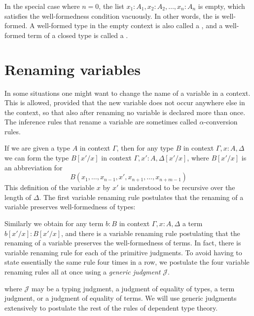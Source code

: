 In the special case where $n=0$, the list $x_1:A_1,x_2:A_2,\ldots,x_n:A_n$ is empty, which satisfies the well-formedness condition vacuously. In other words, the  is well-formed. A well-formed type in the empty context is also called a , and a well-formed term of a closed type is called a .

\section{Renaming variables}
In some situations one might want to change the name of a variable in a context. This is allowed, provided that the new variable does not occur anywhere else in the context, so that also after renaming no variable is declared more than once. 
The inference rules that rename a variable are sometimes called $\alpha$-conversion rules. 

If we are given a type $A$ in context $\Gamma$, then for any type $B$ in context $\Gamma,x:A,\Delta$ we can form the type $B[x'/x]$ in context $\Gamma,x':A,\Delta[x'/x]$, where $B[x'/x]$ is an abbreviation for
\begin{equation*}
B(x_1,\ldots,x_{n-1},x',x_{n+1},\ldots,x_{n+m-1})
\end{equation*}
This definition of  the variable $x$ by $x'$ is understood to be recursive over the length of $\Delta$. The first variable renaming rule postulates that the renaming of a variable preserves well-formedness of types:
\begin{prooftree}
\end{prooftree}

Similarly we obtain for any term $b:B$ in context $\Gamma,x:A,\Delta$ a term $b[x'/x]:B[x'/x]$, and there is a variable renaming rule postulating that the renaming of a variable preserves the well-formedness of terms.
In fact, there is variable renaming rule for each of the primitive judgments. To avoid having to state essentially the same rule four times in a row, we postulate the four variable renaming rules all at once using a \emph{generic judgment} $\mathcal{J}$. 
\begin{prooftree}
\end{prooftree}
where $\mathcal{J}$ may be a typing judgment, a judgment of equality of types, a term judgment, or a judgment of equality of terms.
We will use generic judgments extensively to postulate the rest of the rules of dependent type theory.

